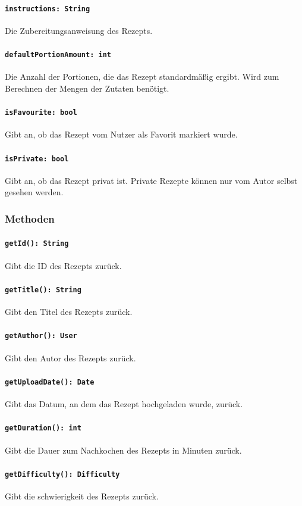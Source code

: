 \documentclass{entwurfsheft}
\begin{document}
\paragraph{\texttt{instructions: String}}
Die Zubereitungsanweisung des Rezepts.
\paragraph{\texttt{defaultPortionAmount: int}}
Die Anzahl der Portionen, die das Rezept standardmäßig ergibt. Wird zum Berechnen der Mengen der Zutaten benötigt.
\paragraph{\texttt{isFavourite: bool}}
Gibt an, ob das Rezept vom Nutzer als Favorit markiert wurde.
\paragraph{\texttt{isPrivate: bool}}
Gibt an, ob das Rezept privat ist. Private Rezepte können nur vom Autor selbst gesehen werden.

\subsubsection*{Methoden}
\paragraph{\texttt{getId(): String}}
Gibt die ID des Rezepts zurück.
\paragraph{\texttt{getTitle(): String}}
Gibt den Titel des Rezepts zurück.
\paragraph{\texttt{getAuthor(): User}}
Gibt den Autor des Rezepts zurück.
\paragraph{\texttt{getUploadDate(): Date}}
Gibt das Datum, an dem das Rezept hochgeladen wurde, zurück.
\paragraph{\texttt{getDuration(): int}}
Gibt die Dauer zum Nachkochen des Rezepts in Minuten zurück.
\paragraph{\texttt{getDifficulty(): Difficulty}}
Gibt die \Gls{schwierigkeit} des Rezepts zurück.
\end{document}
